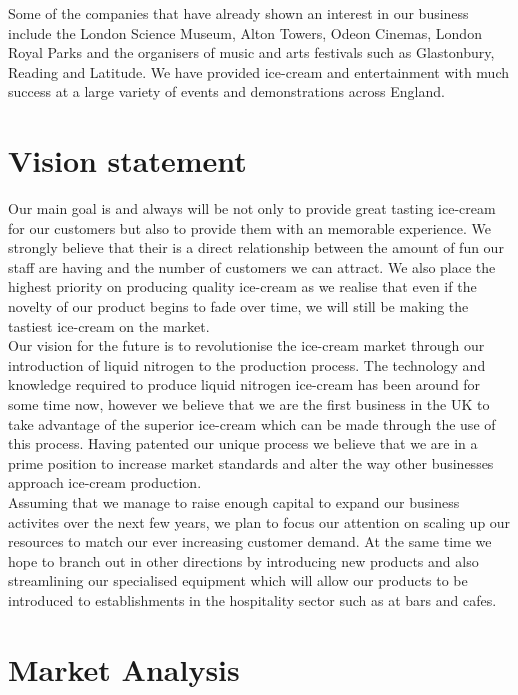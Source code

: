 \documentclass{article}
\begin{document}
Some of the companies that have already shown an interest in our business include the London Science Museum, Alton Towers, Odeon Cinemas, London Royal Parks and the organisers of music and arts festivals such as Glastonbury, Reading and Latitude. We have provided ice-cream and entertainment with much success at a large variety of events and demonstrations across England.


\section{Vision statement}

Our main goal is and always will be not only to provide great tasting ice-cream for our customers but also to provide them with an memorable experience. We strongly believe that their is a direct relationship between the amount of fun our staff are having and the number of customers we can attract. We also place the highest priority on producing quality ice-cream as we realise that even if the novelty of our product begins to fade over time, we will still be making the tastiest ice-cream on the market. \\

Our vision for the future is to revolutionise the ice-cream market through our introduction of liquid nitrogen to the production process. The technology and knowledge required to produce liquid nitrogen ice-cream has been around for some time now, however we believe that we are the first business in the UK to take advantage of the superior ice-cream which can be made through the use of this process. Having patented our unique process we believe that we are in a prime position to increase market standards and alter the way other businesses approach ice-cream production. \\

Assuming that we manage to raise enough capital to expand our business activites over the next few years, we plan to focus our attention on scaling up our resources to match our ever increasing customer demand. At the same time we hope to branch out in other directions by introducing new products and also streamlining our specialised equipment which will allow our products to be introduced to establishments in the hospitality sector such as at bars and cafes. \\

\section{Market Analysis}
  
\end{document}
